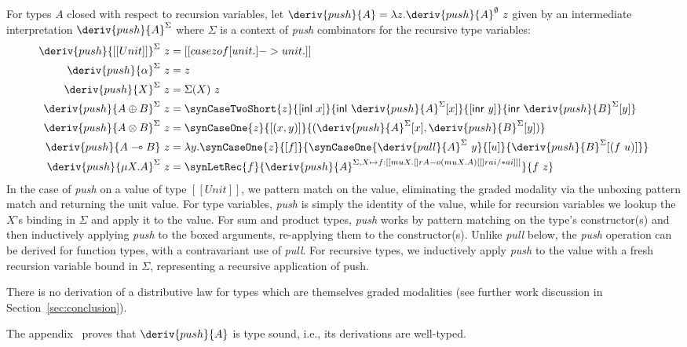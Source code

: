 For types $A$ closed with respect to recursion variables, let $\deriv{push}{A} = \lambda z
. \deriv{push}{A}^\emptyset\ z$ given by an intermediate
interpretation $\deriv{push}{A}^\Sigma$ where $\Sigma$ is a context of \textit{push} combinators for the
recursive type variables:
%
\begin{align*}
\deriv{push}{[[ Unit ]]}^\Sigma \ z & = [[ case z of [ unit . ] -> unit . ]]
\\
\deriv{push}{\alpha}^\Sigma       \ z & = z
  \\
  \deriv{push}{X}^\Sigma     \ z & = \Sigma(X)\ z
\\
\deriv{push}{A \oplus B}^\Sigma \ z & =
\synCaseTwoShort{z}{[\mathsf{inl}\ x]}{\mathsf{inl}\ \deriv{push}{A}^{\Sigma}[x]}{[\mathsf{inr}\ y]}
                            {\mathsf{inr}\
                                      \deriv{push}{B}^{\Sigma}[y]}
\\
\deriv{push}{A \otimes B}^\Sigma \ z & =
\synCaseOne{z}{[(x, y)]}
   {(\deriv{push}{A}^{\Sigma}[x], \deriv{push}{B}^{\Sigma}[y])}
\\
  \deriv{push}{A \multimap B} \ z & =
                                \lambda y .
                                \synCaseOne{z}{[f]}{\synCaseOne{\deriv{pull}{A}^{\Sigma}\
                                    y}{[u]}{\deriv{push}{B}^{\Sigma}[(f
                                \ u)]}}
\\
\deriv{push}{\mu X . A}^\Sigma \ z & =
 \synLetRec{f}{\deriv{push}{A}^{\Sigma, X \mapsto
f : [[ {mu X . {[] r A}} -o {{(mu X . A)} [ [] r ai /* ai ]} ]] }}{f\ z}
\end{align*}
%
In the case of \emph{push} on a value of type $[[ Unit ]]$, we pattern match on the value, eliminating the graded modality via the unboxing pattern match and returning the unit value. For type variables, \emph{push} is simply the identity of the value, while for recursion variables we lookup the $X$'s binding in $\Sigma$ and apply it to the value. For sum and product types, \emph{push} works by pattern matching on the type's constructor(s) and then inductively applying \emph{push} to the boxed arguments, re-applying them to the constructor(s).
Unlike \emph{pull} below, the \emph{push} operation can be derived for function
types, with a contravariant use of \emph{pull}.
For recursive types, we inductively apply \emph{push} to the value
with a fresh recursion variable bound in $\Sigma$, representing a
recursive application of push.

There is no derivation of a distributive law for types which are themselves graded
modalities (see further work discussion in Section~\ref{sec:conclusion}).

The appendix~\cite{appendix} proves that
$\deriv{push}{A}$ is type sound, i.e., its derivations are well-typed.

